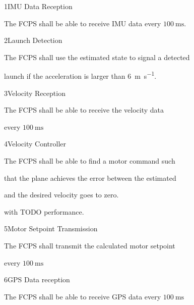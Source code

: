 \req
	{1}{IMU Data Reception}
	{

        The FCPS shall be able to receive IMU data every $\SI{100}{\milli\second}$.

    }
	{}

\req
	{2}{Launch Detection}
	{

        The FCPS shall use the estimated state to signal a detected

        launch if the acceleration is larger than \SI{6}{\meter \per \second}.

    }
	{}

\req
	{3}{Velocity Reception}
	{

        The FCPS shall be able to receive the velocity data

        every $\SI{100}{\milli\second}$

    }
	{}

\req
	{4}{Velocity Controller}
	{

        The FCPS shall be able to find a motor command such

        that the plane achieves the error between the estimated

        and the desired velocity goes to zero.

        with TODO performance.

    }
	{}

\req
	{5}{Motor Setpoint Transmission}
	{

        The FCPS shall transmit the calculated motor setpoint

        every $\SI{100}{\milli\second}$

    }
	{}

\req
	{6}{GPS Data reception}
	{

        The FCPS shall be able to receive GPS data every $\SI{100}{\milli\second}$

    }
	{}

